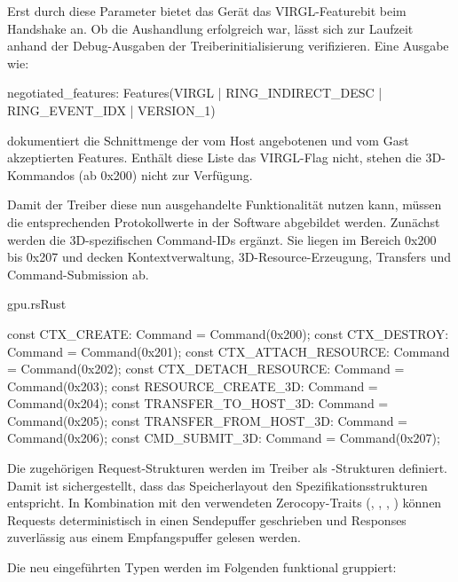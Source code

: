 Erst durch diese Parameter bietet das Gerät das VIRGL-Featurebit beim Handshake an. Ob die Aushandlung erfolgreich war, lässt sich zur Laufzeit anhand der Debug-Ausgaben der Treiberinitialisierung verifizieren. Eine Ausgabe wie:

\begin{terminalblock}
  \begin{textcode}
 negotiated_features: Features(VIRGL | RING_INDIRECT_DESC | RING_EVENT_IDX | VERSION_1)
  \end{textcode}
\end{terminalblock}

dokumentiert die Schnittmenge der vom Host angebotenen und vom Gast akzeptierten Features. Enthält diese Liste das VIRGL-Flag nicht, stehen die 3D-Kommandos (ab 0x200) nicht zur Verfügung.

Damit der Treiber diese nun ausgehandelte Funktionalität nutzen kann, müssen die entsprechenden Protokollwerte in der Software abgebildet werden. Zunächst werden die 3D-spezifischen Command-IDs ergänzt. Sie liegen im Bereich 0x200 bis 0x207 und decken Kontextverwaltung, 3D-Resource-Erzeugung, Transfers und Command-Submission ab.

\begin{codeblock}{gpu.rs}{Rust}
  \begin{rustcode}
const CTX_CREATE: Command = Command(0x200);
const CTX_DESTROY: Command = Command(0x201);
const CTX_ATTACH_RESOURCE: Command = Command(0x202);
const CTX_DETACH_RESOURCE: Command = Command(0x203);
const RESOURCE_CREATE_3D: Command = Command(0x204);
const TRANSFER_TO_HOST_3D: Command = Command(0x205);
const TRANSFER_FROM_HOST_3D: Command = Command(0x206);
const CMD_SUBMIT_3D: Command = Command(0x207);
  \end{rustcode}
\end{codeblock}

Die zugehörigen Request-Strukturen werden im Treiber als \code{\#[repr(C)]}-Strukturen definiert. Damit ist sichergestellt, dass das Speicherlayout den Spezifikationsstrukturen entspricht. In Kombination mit den verwendeten Zerocopy-Traits (, , , ) können Requests deterministisch in einen Sendepuffer geschrieben und Responses zuverlässig aus einem Empfangspuffer gelesen werden.

Die neu eingeführten Typen werden im Folgenden funktional gruppiert:


